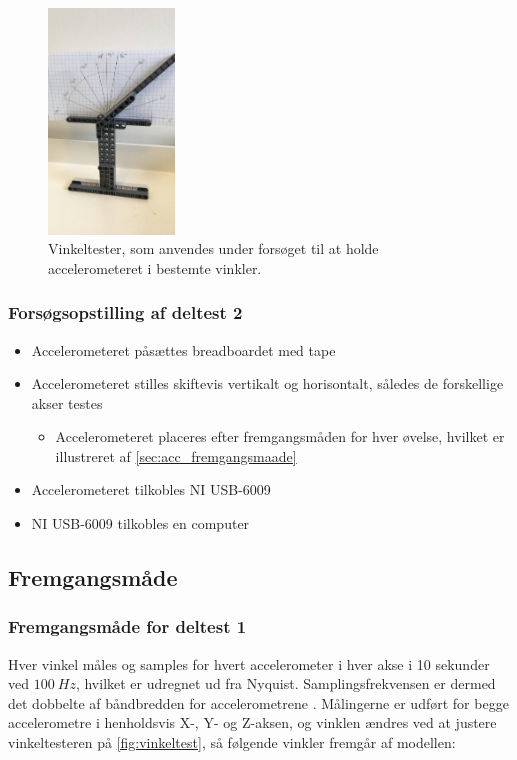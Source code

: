 \begin{figure}[H]
\centering
\includegraphics[width=0.3\textwidth]{figures/vinkeltest}
\caption{Vinkeltester, som anvendes under forsøget til at holde accelerometeret i bestemte vinkler.}
\label{fig:vinkeltest}
\end{figure}

\subsubsection{Forsøgsopstilling af deltest 2}
\begin{itemize}
\item Accelerometeret påsættes breadboardet med tape
\item Accelerometeret stilles skiftevis vertikalt og horisontalt, således de forskellige akser testes
\begin{itemize}
\item Accelerometeret placeres efter fremgangsmåden for hver øvelse, hvilket er illustreret af \autoref{sec:acc_fremgangsmaade}
\end{itemize}
\item Accelerometeret tilkobles NI USB-6009
\item NI USB-6009 tilkobles en computer
\end{itemize}

\subsection{Fremgangsmåde}  

\subsubsection{Fremgangsmåde for deltest 1} \label{sec:vinkel_fremgangsmaade}
Hver vinkel måles og samples for hvert accelerometer i hver akse i 10 sekunder ved $100~Hz$, hvilket er udregnet ud fra Nyquist. Samplingsfrekvensen er dermed det dobbelte af båndbredden for accelerometrene \citep{analogdevices2010}. Målingerne er udført for begge accelerometre i henholdsvis X-, Y- og Z-aksen, og vinklen ændres ved at justere vinkeltesteren på \autoref{fig:vinkeltest}, så følgende vinkler fremgår af modellen:

